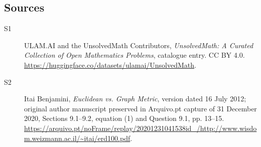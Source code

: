 \documentclass[11pt]{article}
\begin{document}
\subsection{Sources}
\begin{description}
\item[\hypertarget{source:statement:1}{S1}] ULAM.AI and the UnsolvedMath Contributors, \emph{UnsolvedMath: A Curated Collection of Open Mathematics Problems}, catalogue entry. CC BY 4.0. \url{https://huggingface.co/datasets/ulamai/UnsolvedMath}.
\item[\hypertarget{source:statement:2}{S2}] Itai Benjamini, \emph{Euclidean vs. Graph Metric}, version dated 16 July 2012; original author manuscript preserved in Arquivo.pt capture of 31 December 2020, Sections 9.1--9.2, equation (1) and Question 9.1, pp. 13--15. \url{https://arquivo.pt/noFrame/replay/20201231041538id_/http://www.wisdom.weizmann.ac.il/~itai/erd100.pdf}.
\end{description}
\label{end:statement}
\end{document}
